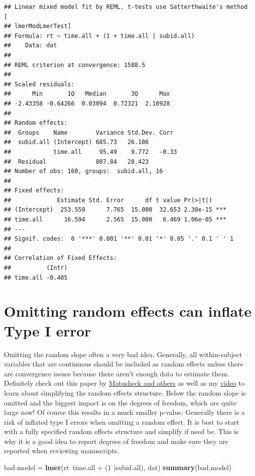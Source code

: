 \documentclass[]{book}
\newenvironment{Shaded}{\begin{snugshade}}{\end{snugshade}}
\newcommand{\KeywordTok}[1]{\textcolor[rgb]{0.13,0.29,0.53}{\textbf{{#1}}}}
\newcommand{\DecValTok}[1]{\textcolor[rgb]{0.00,0.00,0.81}{{#1}}}
\newcommand{\StringTok}[1]{\textcolor[rgb]{0.31,0.60,0.02}{{#1}}}
\newcommand{\NormalTok}[1]{{#1}}
\begin{document}
\begin{verbatim}
## Linear mixed model fit by REML. t-tests use Satterthwaite's method [
## lmerModLmerTest]
## Formula: rt ~ time.all + (1 + time.all | subid.all)
##    Data: dat
## 
## REML criterion at convergence: 1588.5
## 
## Scaled residuals: 
##      Min       1Q   Median       3Q      Max 
## -2.43358 -0.64266  0.03094  0.72321  2.18928 
## 
## Random effects:
##  Groups    Name        Variance Std.Dev. Corr 
##  subid.all (Intercept) 685.73   26.186        
##            time.all     95.49    9.772   -0.33
##  Residual              807.84   28.423        
## Number of obs: 160, groups:  subid.all, 16
## 
## Fixed effects:
##             Estimate Std. Error      df t value Pr(>|t|)    
## (Intercept)  253.559      7.765  15.000  32.653 2.38e-15 ***
## time.all      16.594      2.565  15.000   6.469 1.06e-05 ***
## ---
## Signif. codes:  0 '***' 0.001 '**' 0.01 '*' 0.05 '.' 0.1 ' ' 1
## 
## Correlation of Fixed Effects:
##          (Intr)
## time.all -0.405
\end{verbatim}

\section{Omitting random effects can inflate Type I
error}\label{omitting-random-effects-can-inflate-type-i-error}

Omitting the random slope often a very bad idea. Generally, all
within-subject variables that are continuous should be included as
random effects unless there are convergence issues because there aren't
enough data to estimate them. Definitely check out this paper by
\href{https://www.sciencedirect.com/science/article/pii/S0749596X17300013}{Matusheck
and others} as well as my
\href{https://www.youtube.com/watch?v=pDNEgcl0YhI}{video} to learn about
simplifying the random effects structure. Below the random slope is
omitted and the biggest impact is on the degrees of freedom, which are
quite large now! Of course this results in a much smaller p-value.
Generally there is a risk of inflated type I errors when omitting a
random effect. It is best to start with a fully specified random effects
structure and simplify if need be. This is why it is a good idea to
report degrees of freedom and make sure they are reported when reviewing
manuscripts.

\begin{Shaded}
\begin{Highlighting}[]
\NormalTok{bad.model =}\StringTok{ }\KeywordTok{lmer}\NormalTok{(rt~time.all +}\StringTok{ }\NormalTok{(}\DecValTok{1} \NormalTok{|subid.all), dat)}
\KeywordTok{summary}\NormalTok{(bad.model)  }
\end{Highlighting}
\end{Shaded}
\end{document}

